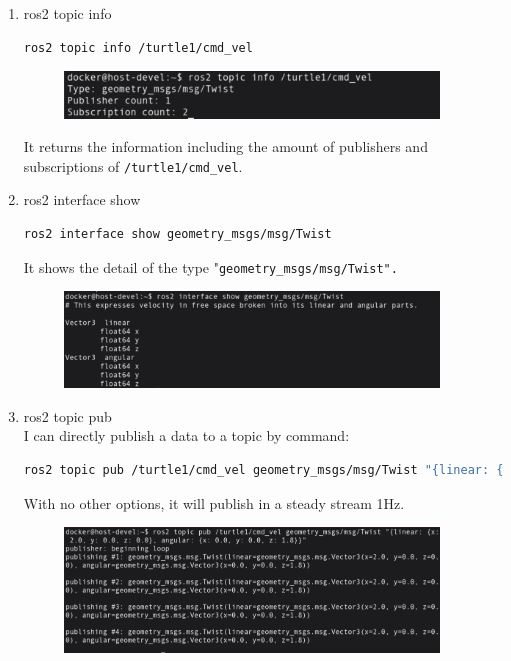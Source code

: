 \documentclass[12pt, a4paper]{article}
\begin{document}
\begin{enumerate}
\newpage
\item ros2 topic info
\begin{lstlisting}[language=bash]
ros2 topic info /turtle1/cmd_vel
\end{lstlisting}
\begin{figure}[h]
	\setlength{\leftskip}{2.4em}
	\includegraphics[width=0.94\textwidth]{p1.4-7}
\end{figure}
It returns the information including the amount of publishers and subscriptions of \texttt{/turtle1/cmd\_vel}.
\item ros2 interface show
\begin{lstlisting}[language=bash]
ros2 interface show geometry_msgs/msg/Twist
\end{lstlisting}
It shows the detail of the type "\texttt{geometry\_msgs/msg/Twist".}
\begin{figure}[h]
	\setlength{\leftskip}{2.4em}
	\includegraphics[width=0.94\textwidth]{p1.4-8}
\end{figure}
\item ros2 topic pub\\
I can directly publish a data to a topic by command:
\begin{lstlisting}[language=bash]
ros2 topic pub /turtle1/cmd_vel geometry_msgs/msg/Twist "{linear: {x: 2.0, y: 0.0, z: 0.0}, angular: {x: 0.0, y: 0.0, z: 1.8}}"
\end{lstlisting}
With no other options, it will publish in a steady stream 1Hz.
\begin{figure}[h]
	\setlength{\leftskip}{2.4em}
	\includegraphics[width=0.94\textwidth]{p1.4-9}

\end{figure}
\end{enumerate}
\end{document}
